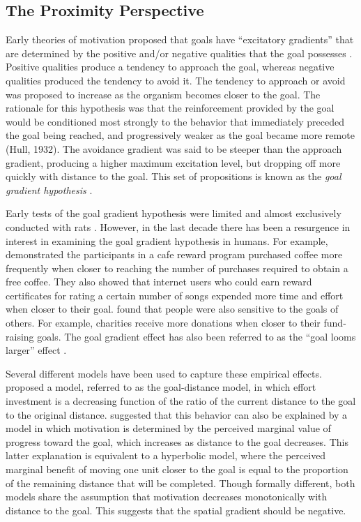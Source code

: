 \documentclass[a4paper,doc,natbib,donotrepeattitle]{apa6}
\begin{document}
\subsection{The Proximity Perspective}

Early theories of motivation proposed that goals have ``excitatory gradients'' that are determined by the positive and/or negative qualities that the goal possesses \cite[e.g.,][]{Lewin1935}. Positive qualities produce a tendency to approach the goal, whereas negative qualities produced the tendency to avoid it. The tendency to approach or avoid was proposed to increase as the organism becomes closer to the goal. The rationale for this hypothesis was that the reinforcement provided by the goal would be conditioned most strongly to the behavior that immediately preceded the goal being reached, and progressively weaker as the goal became more remote (Hull, 1932). The avoidance gradient was said to be steeper than the approach gradient, producing a higher maximum excitation level, but dropping off more quickly with distance to the goal. This set of propositions is known as the \textit{goal gradient hypothesis} \citep{Hull1938}.

Early tests of the goal gradient hypothesis were limited and almost exclusively conducted with rats \citep[e.g.,][]{Berg1942,Anderson1933,Weiss1960}. However, in the last decade there has been a resurgence in interest in examining the goal gradient hypothesis in humans. For example, \cite{Kivetz2006} demonstrated the participants in a cafe reward program purchased coffee more frequently when closer to reaching the number of purchases required to obtain a free coffee. They also showed that internet users who could earn reward certificates for rating a certain number of songs expended more time and effort when closer to their goal. \cite{Cryder2013} found that people were also sensitive to the goals of others. For example, charities receive more donations when closer to their fund-raising goals. The goal gradient effect has also been referred to as the ``goal looms larger'' effect \citep[e.g.,][]{Schmidt2007}.

Several different models have been used to capture these empirical effects. \cite{Kivetz2006} proposed a model, referred to as the goal-distance model, in which effort investment is a decreasing function of the ratio of the current distance to the goal to the original distance. \cite{Bonezzi2011} suggested that this behavior can also be explained by a model in which motivation is determined by the perceived marginal value of progress toward the goal, which increases as distance to the goal decreases. This latter explanation is equivalent to a hyperbolic model, where the perceived marginal benefit of moving one unit closer to the goal is equal to the proportion of the remaining distance that will be completed. Though formally different, both models share the assumption that motivation decreases monotonically with distance to the goal. This suggests that the spatial gradient should be negative.
\end{document}
